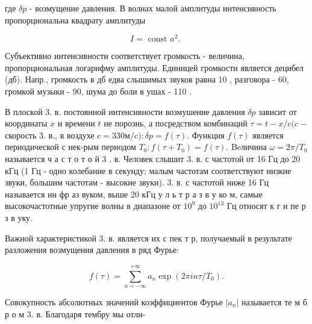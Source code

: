 \documentclass[10pt]{article}
\begin{document}
где $\delta p$ - возмущение давления. В волнах малой амплитуды интенсивность пропорциональна квадрату амплитуды



\[

I=\text { const } a^{2} \text {. }

\]



Субъективно интенсивности соответствует громкость - величина, пропорциональная логарифму амплитуды. Единицей громкости является децибел (дб). Напр., громкость в дб едва слышимых звуков равна 10 , разговора - 60, громкой музыки - 90, шума до боли в ушах - 110 .



В плоской 3. в. постоянной интенсивности возмушение давления $\delta p$ зависит от координаты $x$ и времени $t$ не порознь, а посредством комбинаций $\tau=t-x / c(c-$ скорость 3. в., в воздухе $c=330 \mathrm{м} / \mathrm{c}): \delta p=f(\tau)$. Функция $f(\tau)$ является периодической с нек-рым периодом $T_{0}: f\left(\tau+T_{0}\right)=f(\tau)$. Beличина $\omega=2 \pi / T_{0}$ называется ч а с т о т о й 3 . в. Человек слышит 3. в. с частотой от 16 Гц до 20 кГц (1 Гц - одно колебание в секунду; малым частотам соответствуют низкие звуки, большим частотам - высокие звуки). 3. в. с частотой ниже 16 Гц называется ин фр аз вуком, выше 20 кГц у л ь т р а з в у ко м, самые высокочастотные упругие волны в диапазоне от $10^{9}$ до $10^{13}$ Гц относят к г и пе р з в уку.



Важной характеристикой 3. в. является их с пек т р, получаемый в результате разложения возмущения давления в ряд Фурье:



\[

f(\tau)=\sum_{n=-\infty}^{+\infty} a_{n} \exp \left(2 \pi i n \tau / T_{0}\right) .

\]



Совокупность абсолютных значений коэффициентов Фурье $\left|a_{n}\right|$ называется те м б р о м 3. в. Благодаря тембру мы отли-
\end{document}
